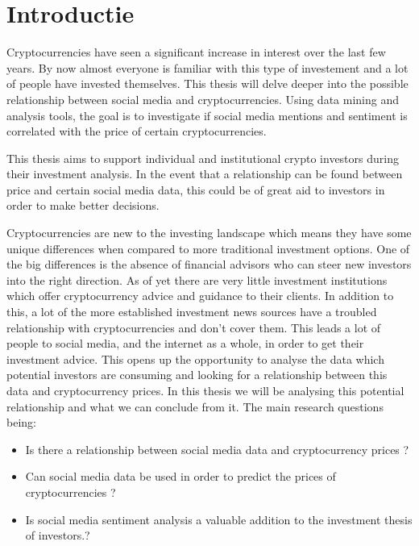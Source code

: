 
\section{Introductie}%
\label{sec:introductie}

\noindent Cryptocurrencies have seen a significant increase in interest over the last few years. By now almost everyone is familiar with this type of investement and a lot of people have invested themselves. This thesis will delve deeper into the possible relationship between social media and cryptocurrencies. Using data mining and analysis tools, the goal is to investigate if social media mentions and sentiment is correlated with the price of certain cryptocurrencies.  

\noindent This thesis aims to support individual and institutional crypto investors during their investment analysis. In the event that a relationship can be found between price and certain social media data, this could be of great aid to investors in order to make better decisions. 

\noindent Cryptocurrencies are new to the investing landscape which means they have some unique differences when compared to more traditional investment options. One of the big differences is the absence of financial advisors who can steer new investors into the right direction. As of yet there are very little investment institutions which offer cryptocurrency advice and guidance to their clients. In addition to this, a lot of the more established investment news sources have a troubled relationship with cryptocurrencies and don't cover them. This leads a lot of people to social media, and the internet as a whole, in order to get their investment advice. This opens up the opportunity to analyse the data which potential investors are consuming and looking for a relationship between this data and cryptocurrency prices. In this thesis we will be analysing this potential relationship and what we can conclude from it. The main research questions being:

\begin{itemize}
    \item Is there a relationship between social media data and cryptocurrency prices ?
    \item Can social media data be used in order to predict the prices of cryptocurrencies ?
    \item Is social media sentiment analysis a valuable addition to the investment thesis of investors.?
\end{itemize}


